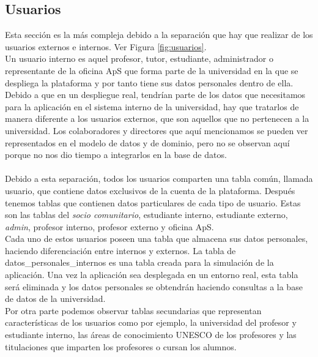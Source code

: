 \documentclass[11pt]{book}
\begin{document}
\subsection{Usuarios}
Esta sección es la más compleja debido a la separación que hay que realizar de los usuarios externos e internos. Ver Figura \ref{fig:usuarios}.\\
Un usuario interno es aquel profesor, tutor, estudiante, administrador o representante de la oficina ApS que forma parte de la universidad en la que se despliega la plataforma y por tanto tiene sus datos personales dentro de ella. Debido a que en un despliegue real, tendrían parte de los datos que necesitamos para la aplicación en el sistema interno de la universidad, hay que tratarlos de manera diferente a los usuarios externos, que son aquellos que no pertenecen a la universidad. Los colaboradores y directores que aquí mencionamos se pueden ver representados en el modelo de datos y de dominio, pero no se observan aquí porque no nos dio tiempo a integrarlos en la base de datos.\\\\
Debido a esta separación, todos los usuarios comparten una tabla común, llamada usuario, que contiene datos exclusivos de la cuenta de la plataforma. Después tenemos tablas que contienen datos particulares de cada tipo de usuario. Estas son las tablas del \textit{socio comunitario}, estudiante interno, estudiante externo, \textit{admin}, profesor interno, profesor externo y oficina ApS.\\
Cada uno de estos usuarios poseen una tabla que almacena sus datos personales, haciendo diferenciación entre internos y externos. La tabla de datos\_personales\_internos es una tabla creada para la simulación de la aplicación. Una vez la aplicación sea desplegada en un entorno real, esta tabla será eliminada y los datos personales se obtendrán haciendo consultas a la base de datos de la universidad.\\
Por otra parte podemos observar tablas secundarias que representan características de los usuarios como por ejemplo, la universidad del profesor y estudiante interno, las áreas de conocimiento UNESCO de los profesores y las titulaciones que imparten los profesores o cursan los alumnos.
\end{document}

